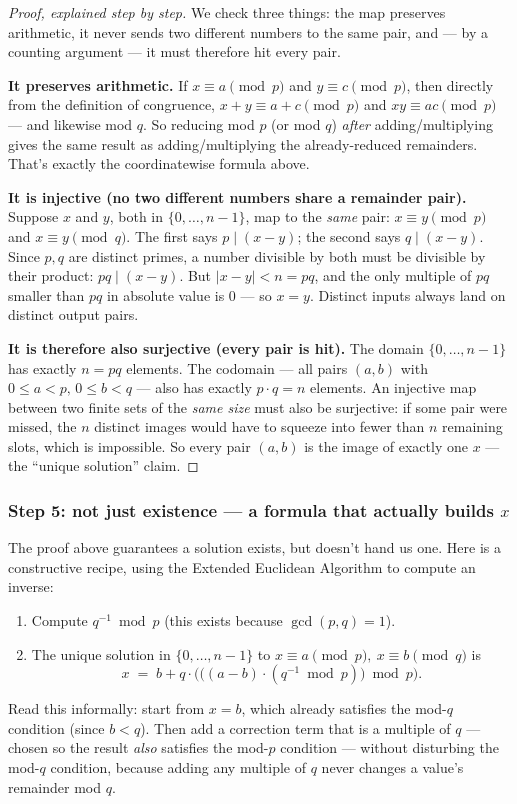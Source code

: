 \begin{proof}[Proof, explained step by step]
We check three things: the map preserves arithmetic, it never sends two different numbers to the same pair, and — by a counting argument — it must therefore hit every pair.

\textbf{It preserves arithmetic.} If $x\equiv a\pmod p$ and $y\equiv c\pmod p$, then directly from the definition of congruence, $x+y\equiv a+c\pmod p$ and $xy\equiv ac\pmod p$ — and likewise mod $q$. So reducing mod $p$ (or mod $q$) \emph{after} adding/multiplying gives the same result as adding/multiplying the already-reduced remainders. That's exactly the coordinatewise formula above.

\textbf{It is injective (no two different numbers share a remainder pair).} Suppose $x$ and $y$, both in $\{0,\dots,n-1\}$, map to the \emph{same} pair: $x\equiv y\pmod p$ and $x\equiv y\pmod q$. The first says $p\mid(x-y)$; the second says $q\mid(x-y)$. Since $p,q$ are distinct primes, a number divisible by both must be divisible by their product: $pq\mid(x-y)$. But $|x-y|<n=pq$, and the only multiple of $pq$ smaller than $pq$ in absolute value is $0$ — so $x=y$. Distinct inputs always land on distinct output pairs.

\textbf{It is therefore also surjective (every pair is hit).} The domain $\{0,\dots,n-1\}$ has exactly $n=pq$ elements. The codomain — all pairs $(a,b)$ with $0\le a<p,\,0\le b<q$ — also has exactly $p\cdot q=n$ elements. An injective map between two finite sets of the \emph{same size} must also be surjective: if some pair were missed, the $n$ distinct images would have to squeeze into fewer than $n$ remaining slots, which is impossible. So every pair $(a,b)$ is the image of exactly one $x$ — the ``unique solution'' claim.
\end{proof}

\subsubsection*{Step 5: not just existence — a formula that actually builds $x$}

The proof above guarantees a solution exists, but doesn't hand us one. Here is a constructive recipe, using the Extended Euclidean Algorithm to compute an inverse:
\begin{enumerate}
\item Compute $q^{-1}\bmod p$ (this exists because $\gcd(p,q)=1$).
\item The unique solution in $\{0,\dots,n-1\}$ to $x\equiv a\pmod p,\ x\equiv b\pmod q$ is
\[
x \;=\; b + q\cdot\Big(\big((a-b)\cdot(q^{-1}\bmod p)\big)\bmod p\Big).
\]
\end{enumerate}
Read this informally: start from $x=b$, which already satisfies the mod-$q$ condition (since $b<q$). Then add a correction term that is a multiple of $q$ — chosen so the result \emph{also} satisfies the mod-$p$ condition — without disturbing the mod-$q$ condition, because adding any multiple of $q$ never changes a value's remainder mod $q$.

